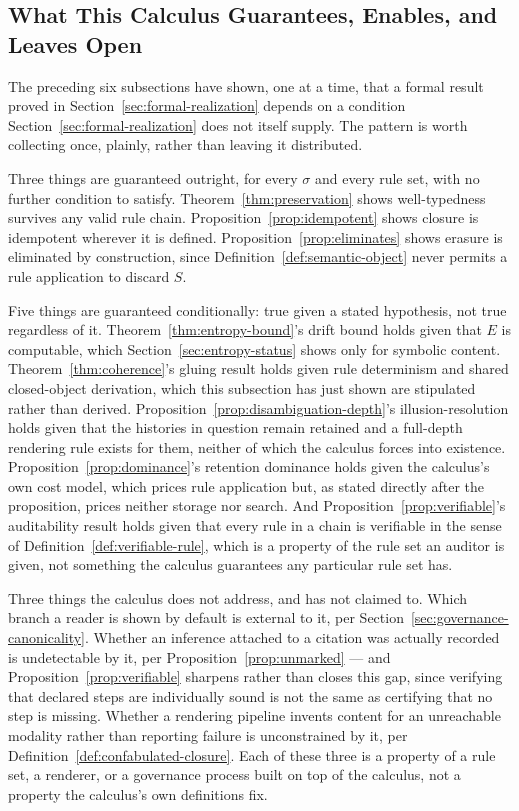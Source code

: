 \documentclass[11pt]{article}
\theoremstyle{definition}
\begin{document}
\subsection{What This Calculus Guarantees, Enables, and Leaves Open}
\label{sec:guarantees-summary}

The preceding six subsections have shown, one at a time, that a formal result proved in Section~\ref{sec:formal-realization} depends on a condition Section~\ref{sec:formal-realization} does not itself supply. The pattern is worth collecting once, plainly, rather than leaving it distributed.

Three things are guaranteed outright, for every $\sigma$ and every rule set, with no further condition to satisfy. Theorem~\ref{thm:preservation} shows well-typedness survives any valid rule chain. Proposition~\ref{prop:idempotent} shows closure is idempotent wherever it is defined. Proposition~\ref{prop:eliminates} shows erasure is eliminated by construction, since Definition~\ref{def:semantic-object} never permits a rule application to discard $S$.

Five things are guaranteed conditionally: true given a stated hypothesis, not true regardless of it. Theorem~\ref{thm:entropy-bound}'s drift bound holds given that $E$ is computable, which Section~\ref{sec:entropy-status} shows only for symbolic content. Theorem~\ref{thm:coherence}'s gluing result holds given rule determinism and shared closed-object derivation, which this subsection has just shown are stipulated rather than derived. Proposition~\ref{prop:disambiguation-depth}'s illusion-resolution holds given that the histories in question remain retained and a full-depth rendering rule exists for them, neither of which the calculus forces into existence. Proposition~\ref{prop:dominance}'s retention dominance holds given the calculus's own cost model, which prices rule application but, as stated directly after the proposition, prices neither storage nor search. And Proposition~\ref{prop:verifiable}'s auditability result holds given that every rule in a chain is verifiable in the sense of Definition~\ref{def:verifiable-rule}, which is a property of the rule set an auditor is given, not something the calculus guarantees any particular rule set has.

Three things the calculus does not address, and has not claimed to. Which branch a reader is shown by default is external to it, per Section~\ref{sec:governance-canonicality}. Whether an inference attached to a citation was actually recorded is undetectable by it, per Proposition~\ref{prop:unmarked} --- and Proposition~\ref{prop:verifiable} sharpens rather than closes this gap, since verifying that declared steps are individually sound is not the same as certifying that no step is missing. Whether a rendering pipeline invents content for an unreachable modality rather than reporting failure is unconstrained by it, per Definition~\ref{def:confabulated-closure}. Each of these three is a property of a rule set, a renderer, or a governance process built on top of the calculus, not a property the calculus's own definitions fix.
\end{document}

